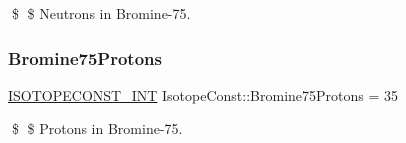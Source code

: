 \$ \$ Neutrons in Bromine-\/75. \mbox{\label{group___isotope_const-_bromine-_br75_gab4985b1b07d74e9dd8f71e790533d675}} 
\subsubsection{\texorpdfstring{Bromine75\+Protons}{Bromine75Protons}}
{\footnotesize\ttfamily \mbox{\hyperlink{group___isotope_const-_macros_ga5f18360b3e99483a35c32d789e62621c}{I\+S\+O\+T\+O\+P\+E\+C\+O\+N\+S\+T\+\_\+\+I\+NT}} Isotope\+Const\+::\+Bromine75\+Protons = 35}

\$ \$ Protons in Bromine-\/75. 